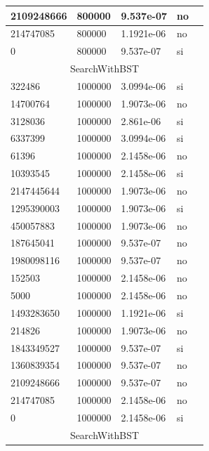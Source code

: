\documentclass[12pt, fleqn]{article}                             %
\theoremstyle{break}                                            %
\begin{document}
\begin{longtable}{|m{5em}|m{5em}|m{10em}|m{5em}|@{}m{0pt}@{}}
            2109248666& 800000  & 9.537e-07 & no &\\[1em]    \hline
            214747085& 800000  & 1.1921e-06 & no &\\[1em]    \hline
            0& 800000  & 9.537e-07 & si &\\[1em]    \hline
            \multicolumn{5}{|c|}{SearchWithBST}   \\          \hline
            322486& 1000000  & 3.0994e-06 & si &\\[1em]    \hline
            14700764& 1000000  & 1.9073e-06 & no &\\[1em]    \hline
            3128036& 1000000  & 2.861e-06 & si &\\[1em]    \hline
            6337399& 1000000  & 3.0994e-06 & si &\\[1em]    \hline
            61396& 1000000  & 2.1458e-06 & no &\\[1em]    \hline
            10393545& 1000000  & 2.1458e-06 & si &\\[1em]    \hline
            2147445644& 1000000  & 1.9073e-06 & no &\\[1em]    \hline
            1295390003& 1000000  & 1.9073e-06 & si &\\[1em]    \hline
            450057883& 1000000  & 1.9073e-06 & no &\\[1em]    \hline
            187645041& 1000000  & 9.537e-07 & no &\\[1em]    \hline
            1980098116& 1000000  & 9.537e-07 & no &\\[1em]    \hline
            152503& 1000000  & 2.1458e-06 & no &\\[1em]    \hline
            5000& 1000000  & 2.1458e-06 & no &\\[1em]    \hline
            1493283650& 1000000  & 1.1921e-06 & si &\\[1em]    \hline
            214826& 1000000  & 1.9073e-06 & no &\\[1em]    \hline
            1843349527& 1000000  & 9.537e-07 & si &\\[1em]    \hline
            1360839354& 1000000  & 9.537e-07 & no &\\[1em]    \hline
            2109248666& 1000000  & 9.537e-07 & no &\\[1em]    \hline
            214747085& 1000000  & 2.1458e-06 & no &\\[1em]    \hline
            0& 1000000  & 2.1458e-06 & si &\\[1em]    \hline
            \multicolumn{5}{|c|}{SearchWithBST}   \\          \hline

\end{longtable}
\end{document}
